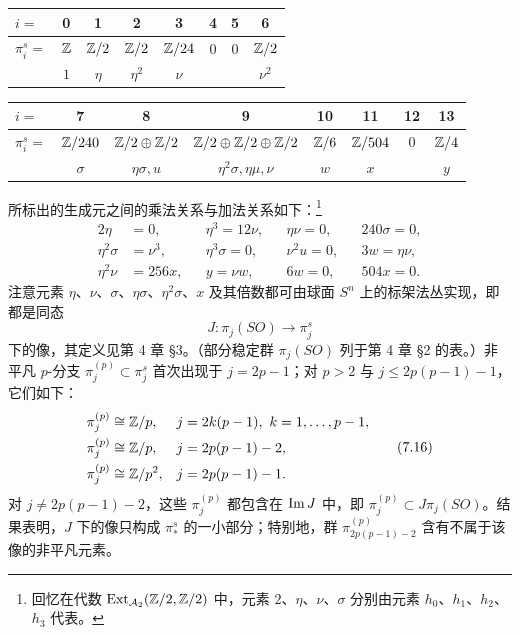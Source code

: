 \begin{center}
\footnotesize
\setlength{\tabcolsep}{2.5pt}%
\begin{tabular}{l*{7}{c}}
\toprule
$i=$ & 0 & 1 & 2 & 3 & 4 & 5 & 6\\
\midrule
$\pi_i^s=$ & $\mathbb{Z}$ & $\mathbb{Z}/2$ & $\mathbb{Z}/2$ & $\mathbb{Z}/24$ & $0$ & $0$ & $\mathbb{Z}/2$\\
\midrule
 & $1$ & $\eta$ & $\eta^2$ & $\nu$ & & & $\nu^2$\\
\bottomrule
\end{tabular}
\end{center}

\begin{center}
\footnotesize
\setlength{\tabcolsep}{2.5pt}%
\begin{tabular}{l*{7}{c}}
\toprule
$i=$ & 7 & 8 & 9 & 10 & 11 & 12 & 13\\
\midrule
$\pi_i^s=$ & $\mathbb{Z}/240$ & $\mathbb{Z}/2\oplus\mathbb{Z}/2$ & $\mathbb{Z}/2\oplus\mathbb{Z}/2\oplus\mathbb{Z}/2$ & $\mathbb{Z}/6$ & $\mathbb{Z}/504$ & $0$ & $\mathbb{Z}/4$\\
\midrule
 & $\sigma$ & $\eta\sigma,u$ & $\eta^2\sigma,\eta\mu,\nu$ & $w$ & $x$ & & $y$\\
\bottomrule
\end{tabular}
\end{center}
所标出的生成元之间的乘法关系与加法关系如下：\footnote{回忆在代数 $\operatorname{Ext}_{\mathcal{A}_2}(\mathbb{Z}/2,\mathbb{Z}/2)$ 中，元素 $2$、$\eta$、$\nu$、$\sigma$ 分别由元素 $h_0$、$h_1$、$h_2$、$h_3$ 代表。}
\begin{equation}
\begin{aligned}
2\eta&=0, &&\eta^3=12\nu, &&\eta\nu=0, &&240\sigma=0,\\
\eta^2\sigma&=\nu^3, &&\eta^3\sigma=0, &&\nu^2u=0, &&3w=\eta\nu,\\
\eta^2\nu&=256x, &&y=\nu w, &&6w=0, &&504x=0.
\end{aligned}
\tag{7.15}
\end{equation}
注意元素 $\eta$、$\nu$、$\sigma$、$\eta\sigma$、$\eta^2\sigma$、$x$ 及其倍数都可由球面 $S^n$ 上的标架法丛实现，即都是同态
\[
J:\pi_j(SO)\longrightarrow\pi_j^s
\]
下的像，其定义见第 4 章 §3。（部分稳定群 $\pi_j(SO)$ 列于第 4 章 §2 的表。）非平凡 $p$-分支 $\pi_j^{(p)}\subset\pi_j^s$ 首次出现于 $j=2p-1$；对 $p>2$ 与 $j\le2p(p-1)-1$，它们如下：
\begin{equation}
\begin{aligned}
\pi_j^{(p)}&\cong\mathbb{Z}/p, && j=2k(p-1),\ k=1,\dots,p-1,\\
\pi_j^{(p)}&\cong\mathbb{Z}/p, && j=2p(p-1)-2,\\
\pi_j^{(p)}&\cong\mathbb{Z}/p^2, && j=2p(p-1)-1.
\end{aligned}
\tag{7.16}
\end{equation}
对 $j\ne2p(p-1)-2$，这些 $\pi_j^{(p)}$ 都包含在 $\operatorname{Im} J$ 中，即 $\pi_j^{(p)}\subset J\pi_j(SO)$。结果表明，$J$ 下的像只构成 $\pi_*^s$ 的一小部分；特别地，群 $\pi_{2p(p-1)-2}^{(p)}$ 含有不属于该像的非平凡元素。
